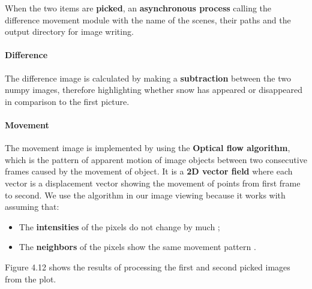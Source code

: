 \documentclass[12pt, a4paper]{report}
\begin{document}
	When the two items are \textbf{picked}, an \textbf{asynchronous process} calling the difference movement module with the name of the scenes, their paths and the output directory for image writing. 
	
	\paragraph{Difference}
	The difference image is calculated by making a \textbf{subtraction} between the two numpy images, therefore highlighting whether snow has appeared or disappeared in comparison to the first picture. 
	
	\paragraph{Movement}
	The movement image is implemented by using the \textbf{Optical flow algorithm}, which is the pattern of apparent motion of image objects between two consecutive frames caused by the movement of object. It is a \textbf{2D vector field} where each vector is a displacement vector showing the movement of points from first frame to second. \cite{optical_flow} We use the algorithm in our image viewing because it works with assuming that:
	\begin{itemize}
		\item The \textbf{intensities} of the pixels do not change by much \cite{optical_flow};
		\item The \textbf{neighbors} of the pixels show the same movement pattern \cite{optical_flow}.
	\end{itemize}
	
	Figure 4.12 shows the results of processing the first and second picked images from the plot.
	
\end{document}

